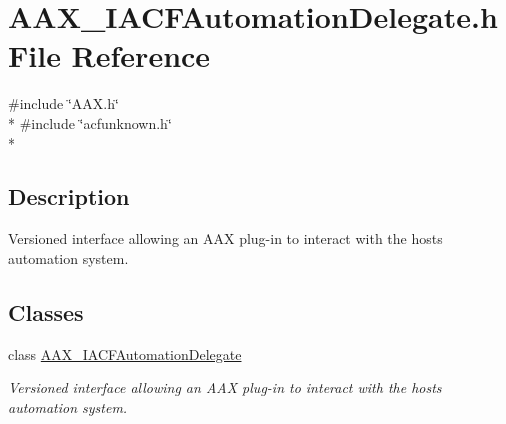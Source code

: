 \hypertarget{a00216}{}\section{A\+A\+X\+\_\+\+I\+A\+C\+F\+Automation\+Delegate.\+h File Reference}
\label{a00216}
{\ttfamily \#include \char`\"{}A\+A\+X.\+h\char`\"{}}\\*
{\ttfamily \#include \char`\"{}acfunknown.\+h\char`\"{}}\\*


\subsection{Description}
Versioned interface allowing an A\+A\+X plug-\/in to interact with the host\textquotesingle{}s automation system. 

\subsection*{Classes}
\begin{DoxyCompactItemize}
\item 
class \hyperlink{a00048}{A\+A\+X\+\_\+\+I\+A\+C\+F\+Automation\+Delegate}
\begin{DoxyCompactList}\small\item\em Versioned interface allowing an A\+A\+X plug-\/in to interact with the host\textquotesingle{}s automation system. \end{DoxyCompactList}\end{DoxyCompactItemize}

